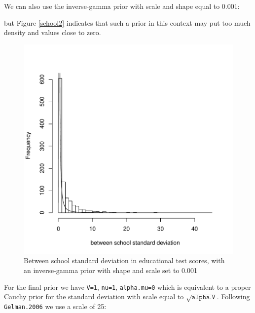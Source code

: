 \documentclass{article}
\begin{document}
We can also use the inverse-gamma prior with scale and shape equal to 0.001:

\begin{Schunk}
\end{Schunk}

but Figure \ref{school2} indicates that such a prior in this context may put too much density and values close to zero.


\begin{figure}[!h]
\begin{center}
\includegraphics{Lecture8-014}
\end{center}
\caption{Between school standard deviation in educational test scores, with an inverse-gamma prior with shape and scale set to 0.001}
\label{school2-fig}
\end{figure}


For the final prior we have \texttt{V=1}, \texttt{nu=1}, \texttt{alpha.mu=0} which is equivalent to a proper Cauchy prior for the standard deviation with scale equal to $$. Following \texttt{Gelman.2006} we use a scale of 25: 
\end{document}
